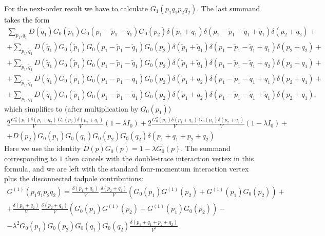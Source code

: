 \documentclass[12pt]{article}
\newcommand{\lr}[1]{ \left( #1 \right) }
\begin{document}
 For the next-order result we have to calculate $G_1\lr{p_1 q_1 p_2 q_2}$. The last summand takes the form
\begin{eqnarray}
\label{G4_nlo1}
 \sum\limits_{\tilde{p}_1, \tilde{q}_1} D\lr{\tilde{q}_1} G_0\lr{\tilde{p}_1} G_0\lr{p_1 - \tilde{p}_1 - \tilde{q}_1} G_0\lr{p_2}
 \delta\lr{\tilde{p}_1 + q_1} \delta\lr{p_1 - \tilde{p}_1 - \tilde{q}_1 + \tilde{q}_1} \delta\lr{p_2 + q_2}
 + \nonumber \\ +
 \sum\limits_{\tilde{p}_1, \tilde{q}_1} D\lr{\tilde{q}_1} G_0\lr{\tilde{p}_1} G_0\lr{p_1 - \tilde{p}_1 - \tilde{q}_1} G_0\lr{p_2}
 \delta\lr{\tilde{p}_1 + \tilde{q}_1} \delta\lr{p_1 - \tilde{p}_1 - \tilde{q}_1 + q_1} \delta\lr{p_2 + q_2}
 + \nonumber \\ +
 \sum\limits_{\tilde{p}_1, \tilde{q}_1} D\lr{\tilde{q}_1} G_0\lr{\tilde{p}_1} G_0\lr{p_1 - \tilde{p}_1 - \tilde{q}_1} G_0\lr{p_2}
 \delta\lr{\tilde{p}_1 + \tilde{q}_1} \delta\lr{p_1 - \tilde{p}_1 - \tilde{q}_1 + q_2} \delta\lr{p_2 + q_1}
 + \nonumber \\ +
 \sum\limits_{\tilde{p}_1, \tilde{q}_1} D\lr{\tilde{q}_1} G_0\lr{\tilde{p}_1} G_0\lr{p_1 - \tilde{p}_1 - \tilde{q}_1} G_0\lr{p_2}
 \delta\lr{\tilde{p}_1 + q_2} \delta\lr{p_1 - \tilde{p}_1 - \tilde{q}_1 + q_1} \delta\lr{p_2 + \tilde{q}_1}
 + \nonumber \\ +
 \sum\limits_{\tilde{p}_1, \tilde{q}_1} D\lr{\tilde{q}_1} G_0\lr{\tilde{p}_1} G_0\lr{p_1 - \tilde{p}_1 - \tilde{q}_1} G_0\lr{p_2}
 \delta\lr{\tilde{p}_1 + q_2} \delta\lr{p_1 - \tilde{p}_1 - \tilde{q}_1 + \tilde{q}_1} \delta\lr{p_2 + q_1} ,
\end{eqnarray}
which simplifies to (after multiplication by $G_0\lr{p_1}$)
\begin{eqnarray}
\label{G4_nlo2}
 2 \frac{G_0^2\lr{p_1} \delta\lr{p_1 + q_2}}{V} \frac{G_0\lr{p_2} \delta\lr{p_2 + q_1}}{V} \lr{1 - \lambda I_0} +
 2 \frac{G_0^2\lr{p_1} \delta\lr{p_1 + q_1}}{V} \frac{G_0\lr{p_2} \delta\lr{p_2 + q_2}}{V} \lr{1 - \lambda I_0}
 + \nonumber \\ +
 D\lr{p_2} G_0\lr{p_1} G_0\lr{q_1} G_0\lr{p_2} G_0\lr{q_2} \delta\lr{p_1 + q_1 + p_2 + q_2}
\end{eqnarray}
Here we use the identity $D\lr{p} G_0\lr{p} = 1 - \lambda G_0\lr{p}$. The summand corresponding to $1$ then cancels with the double-trace interaction vertex in this formula, and we are left with the standard four-momentum interaction vertex plus the disconnected tadpole contributions:
\begin{eqnarray}
\label{G4_nlo1}
 G^{\lr{1}}\lr{p_1 q_1 p_2 q_2} =
 \frac{\delta\lr{p_1 + q_1}}{V} \, \frac{\delta\lr{p_2 + q_2}}{V}
 \lr{G_0\lr{p_1} G^{\lr{1}}\lr{p_2} + G^{\lr{1}}\lr{p_1} G_0\lr{p_2} }
 + \nonumber \\ +
 \frac{\delta\lr{p_1 + q_2}}{V} \, \frac{\delta\lr{p_2 + q_1}}{V}
 \lr{G_0\lr{p_1} G^{\lr{1}}\lr{p_2} + G^{\lr{1}}\lr{p_1} G_0\lr{p_2} }
 - \nonumber \\ -
 \lambda^2 G_0\lr{p_1} G_0\lr{p_2} G_0\lr{q_1} G_0\lr{q_2} \frac{\delta\lr{p_1 + q_1 + p_2 + q_2}}{V^3}
\end{eqnarray}
\end{document}
